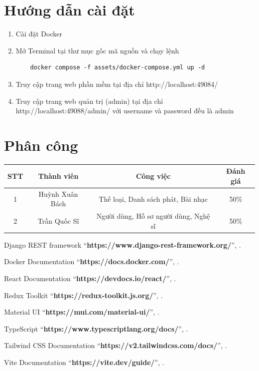 \documentclass[a4paper]{article}
\begin{document}
\section{Hướng dẫn cài đặt}
\begin{enumerate}
    \item Cài đặt Docker
    \item Mở Terminal tại thư mục gốc mã nguồn và chạy lệnh
    \begin{lstlisting}
    docker compose -f assets/docker-compose.yml up -d
    \end{lstlisting}
    \item Truy cập trang web phần mềm tại địa chỉ http://localhost:49084/
    \item Truy cập trang web quản trị (admin) tại địa chỉ http://localhost:49088/admin/ với username và password đều là admin
\end{enumerate}

\section{Phân công}
\begin{table}[h]
    \centering
    \begin{tabular}{|c|c|c|c|}
        \hline
        \color{black} STT & \color{black} Thành viên & \color{black} Công việc & \color{black} Đánh giá \\
        \hline
        \color{black} 1 & \color{black} Huỳnh Xuân Bách & \color{black} Thế loại, Danh sách phát, Bài nhạc & \color{black} 50\% \\
        \hline
        \color{black} 2 & \color{black} Trần Quốc Sĩ & \color{black} Người dùng, Hồ sơ người dùng, Nghệ sĩ & \color{black} 50\% \\
        \hline
    \end{tabular}
\end{table}
\newpage

\begin{thebibliography}{80}
Django REST framework
``\textbf{https://www.django-rest-framework.org/}'',
\textit{}.

Docker Documentation
``\textbf{https://docs.docker.com/}'',
\textit{}.

React Documentation
``\textbf{https://devdocs.io/react/}'',
\textit{}.

Redux Toolkit
``\textbf{https://redux-toolkit.js.org/}'',
\textit{}.

Material UI
``\textbf{https://mui.com/material-ui/}'',
\textit{}.

TypeScript
``\textbf{https://www.typescriptlang.org/docs/}'',
\textit{}.

Tailwind CSS Documentation
``\textbf{https://v2.tailwindcss.com/docs/}'',
\textit{}.

Vite Documentation
``\textbf{https://vite.dev/guide/}'',
\textit{}.

\end{thebibliography}
\end{document}
